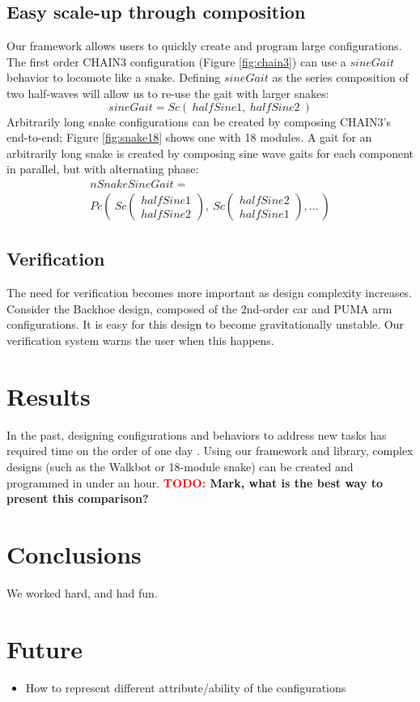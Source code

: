 \documentclass[conference]{IEEEtran}
\theoremstyle{definition}
\newcommand{\TODO}[1]{ {\bf \textcolor{red}{TODO:} #1 }}
\begin{document}
\subsection{Easy scale-up through composition}
Our framework allows users to quickly create and program large configurations. The
first order CHAIN3 configuration (Figure \ref{fig:chain3}) can use a \(sineGait\)
behavior to locomote like a snake. Defining \(sineGait\)  as the series composition
of two half-waves will allow us to re-use the gait with larger snakes:
\begin{displaymath}
sineGait = Sc(~halfSine1,~halfSine2~)
\end{displaymath}
Arbitrarily long snake configurations can be created
by composing CHAIN3's end-to-end; Figure \ref{fig:snake18} shows one with 18 modules.
A gait for an arbitrarily long snake is created by composing sine wave
gaits for each component in parallel, but with alternating phase:
\begin{align*}
nSnakeSineGait = ~~~~~~~~~~~~~~~~~~~~~~~~~~~~~~~~~~~~~~~~~~\\
Pc \left(~Sc\begin{pmatrix} halfSine1 \\ halfSine2 \end{pmatrix},
~Sc\begin{pmatrix} halfSine2 \\ halfSine1 \end{pmatrix},\ldots ~\right)
\end{align*}
\subsection{Verification}
The need for verification becomes more important as design complexity increases.
 Consider the Backhoe design, composed of the 2nd-order car and PUMA arm configurations.
 It is easy for this design to become gravitationally unstable.  Our verification
 system warns the user when this happens.

\section{Results}
In the past, designing configurations and behaviors to address new tasks has required
time on the order of one day \cite{sastra2011using}. Using our framework and library,
complex designs (such as the Walkbot or 18-module snake) can be created and programmed
in under an hour. \TODO{Mark, what is the best
way to present this comparison?} 

\section{Conclusions}
We worked hard, and had fun.

\section{Future}
\begin{itemize}
\item How to represent different attribute/ability of the configurations
\end{itemize}







\end{document}
